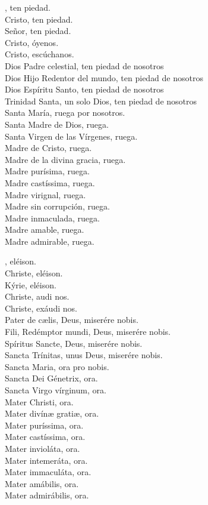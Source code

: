 \documentclass[./L00_main.tex]{subfiles}
\begin{document}
\begin{minipage}[t]{0.475\textwidth}
    , ten piedad.\\
    Cristo, ten piedad.\\
    Señor, ten piedad.\\
    Cristo, óyenos.\\
    Cristo, escúchanos.\\
    Dios Padre celestial, ten piedad de nosotros\\
    Dios Hijo Redentor del mundo, ten piedad de nosotros\\
    Dios Espíritu Santo, ten piedad de nosotros\\
    Trinidad Santa, un solo Dios, ten piedad de nosotros\\
    Santa María, ruega por nosotros.\\
    Santa Madre de Dios, ruega.\\
    Santa Virgen de las Vírgenes, ruega.\\
    Madre de Cristo, ruega.\\
    Madre de la divina gracia, ruega.\\
    Madre purísima, ruega.\\
    Madre castíssima, ruega.\\
    Madre virignal, ruega.\\
    Madre sin corrupción, ruega.\\
    Madre inmaculada, ruega.\\
    Madre amable, ruega.\\
    Madre admirable, ruega.
\end{minipage}
\begin{minipage}[t]{0.475\textwidth}
    , eléison.\\
    Christe, eléison.\\
    Kýrie, eléison.\\
    Christe, audi nos.\\
    Christe, exáudi nos.\\
    Pater de c{\ae}lis, Deus, miserére nobis.\\
    Fili, Redémptor mundi, Deus, miserére nobis.\\
    Spíritus Sancte, Deus, miserére nobis.\\
    Sancta Trínitas, unus Deus, miserére nobis.\\
    Sancta Maria, ora pro nobis.\\
    Sancta Dei Génetrix, ora.\\
    Sancta Virgo vírginum, ora.\\
    Mater Christi, ora.\\
    Mater divín{\ae} grati{\ae}, ora.\\
    Mater puríssima, ora.\\
    Mater castíssima, ora.\\
    Mater invioláta, ora.\\
    Mater intemeráta, ora.\\
    Mater immaculáta, ora.\\
    Mater amábilis, ora.\\
    Mater admirábilis, ora.
\end{minipage}
\end{document}
